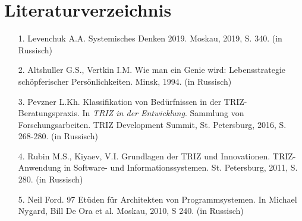 \documentclass[11pt,a4paper]{article}
\begin{document}
\section*{Literaturverzeichnis}

\begin{itemize}
\item[1.] Levenchuk A.A. Systemisches Denken 2019. Moskau, 2019, S. 340. (in
  Russisch)
\item[2.] Altshuller G.S., Vertkin I.M. Wie man ein Genie wird:
  Lebensstrategie schöpferischer Persönlichkeiten. Minsk, 1994. (in Russisch)
\item[3.] Pevzner L.Kh. Klassifikation von Bedürfnissen in der
  TRIZ-Beratungspraxis. In \emph{TRIZ in der Entwicklung}. Sammlung von
  Forschungsarbeiten.  TRIZ Development Summit, St. Petersburg, 2016,
  S. 268-280. (in Russisch)
\item[4.] Rubin M.S., Kiyaev, V.I. Grundlagen der TRIZ und Innovationen.
  TRIZ-Anwendung in Software- und Informationssystemen. St. Petersburg, 2011,
  S. 280. (in Russisch)
\item[5.] Neil Ford. 97 Etüden für Architekten von Programmsystemen. In
  Michael Nygard, Bill De Ora et al. Moskau, 2010, S 240. (in Russisch)
\end{itemize}
\end{document}
